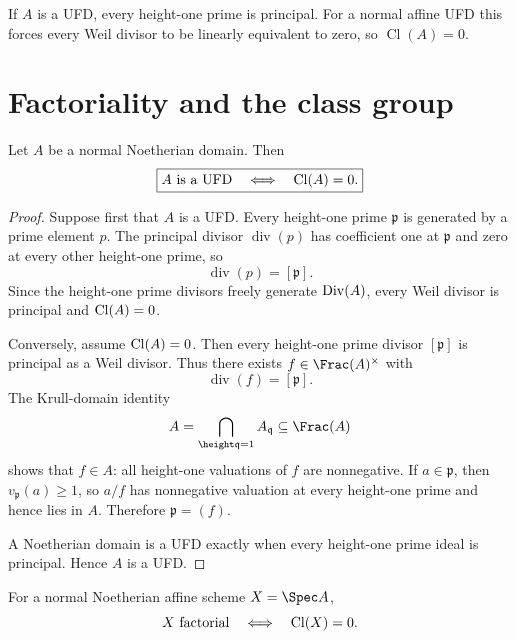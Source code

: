 \begin{example}\label{ex:vi41-expand-01}
If $A$ is a UFD, every height-one prime is principal.  For a normal affine UFD this forces every Weil divisor to be linearly equivalent to zero, so $\operatorname{Cl}(A)=0$.
\end{example}
\section{Factoriality and the class group}

\begin{theorem}\label{thm:vi41-ufd-criterion}
Let \(A\) be a normal Noetherian domain. Then
\[
  \boxed{
  A\text{ is a UFD}
  \quad\Longleftrightarrow\quad
  \operatorname{Cl}(A)=0.
  }
\]
\end{theorem}

\begin{proof}
Suppose first that \(A\) is a UFD. Every height-one prime \(\mathfrak p\) is generated by a prime element \(p\). The principal divisor \(\operatorname{div}(p)\) has coefficient one at \(\mathfrak p\) and zero at every other height-one prime, so
\[
  \operatorname{div}(p)=[\mathfrak p].
\]
Since the height-one prime divisors freely generate \(\operatorname{Div}(A)\), every Weil divisor is principal and \(\operatorname{Cl}(A)=0\).

Conversely, assume \(\operatorname{Cl}(A)=0\). Then every height-one prime divisor \([\mathfrak p]\) is principal as a Weil divisor. Thus there exists \(f\in\Frac(A)^\times\) with
\[
  \operatorname{div}(f)=[\mathfrak p].
\]
The Krull-domain identity
\[
  A=\bigcap_{\height\mathfrak q=1}A_{\mathfrak q}
  \subseteq\Frac(A)
\]
shows that \(f\in A\): all height-one valuations of \(f\) are nonnegative. If \(a\in\mathfrak p\), then \(v_{\mathfrak p}(a)\ge1\), so \(a/f\) has nonnegative valuation at every height-one prime and hence lies in \(A\). Therefore \(\mathfrak p=(f)\).

A Noetherian domain is a UFD exactly when every height-one prime ideal is principal. Hence \(A\) is a UFD.
\end{proof}

\begin{corollary}\label{cor:vi41-affine-factorial}
For a normal Noetherian affine scheme \(X=\Spec A\),
\[
 X\text{ factorial}
 \quad\Longleftrightarrow\quad
 \operatorname{Cl}(X)=0.
\]
\end{corollary}


